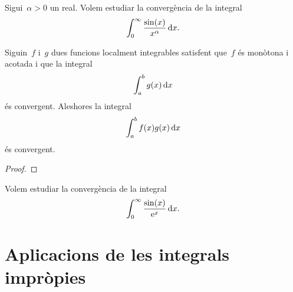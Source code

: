 \documentclass[../../main.tex]{subfiles}
\begin{document}
    \begin{example}
        Sigui~\(\alpha>0\) un real.
        Volem estudiar la convergència de la integral
        \[
            \int_{0}^{\infty}\frac{\sin(x)}{x^{\alpha}}\mathop{}\!\mathrm{d} x.
        \]
        \begin{solution}
        \end{solution}
    \end{example}
    \begin{theorem}
        \label{thm:criteri d'Abel per integrals impròpies}
        Siguin~\(f\) i~\(g\) dues funcions localment integrables satisfent que~\(f\) és monòtona i acotada i que la integral
        \[
            \int_{a}^{b}g(x)\mathop{}\!\mathrm{d} x
        \]
        és convergent.
        Aleshores la integral
        \[
            \int_{a}^{b}f(x)g(x)\mathop{}\!\mathrm{d} x
        \]
        és convergent.
        \begin{proof}
        \end{proof}
    \end{theorem}
    \begin{example}
        \label{ex:criteri d'Abel per integrals impròpies}
        Volem estudiar la convergència de la integral
        \[
            \int_{0}^{\infty}\frac{\sin(x)}{\mathrm{e}^{x}}\mathop{}\!\mathrm{d} x.
        \]
        \begin{solution}
        \end{solution}
    \end{example}
\section{Aplicacions de les integrals impròpies}
\end{document}
